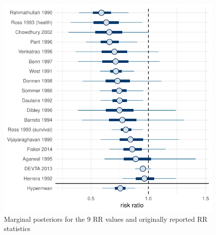 \documentclass[12pt]{article}
\begin{document}
\begin{figure}[h!]
\centering
\includegraphics{baggr-re.pdf}
\caption{Marginal posteriors for the 9 RR values and originally reported RR statistics} \label{baggr-re}
\end{figure}
\end{document}
